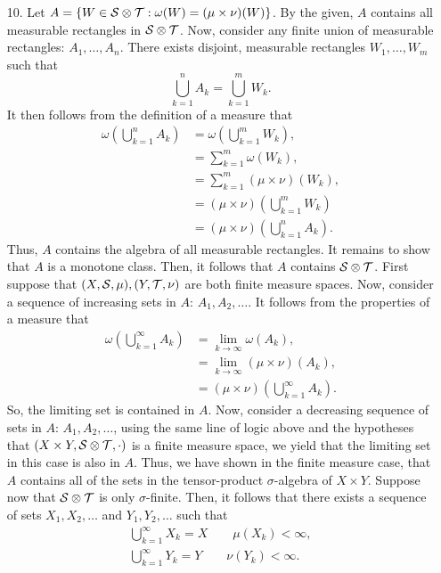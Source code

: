 \documentclass{article}
\theoremstyle{remark}
\begin{document}
\begin{enumerate}[leftmargin=*]
   \item[10.] Let $A = \{W \in \mathcal{S} \otimes \mathcal{T}: \omega(W) = (\mu\times \nu)(W)\}$. By the given, $A$ contains all measurable rectangles in $\mathcal{S} \otimes \mathcal{T}$. Now, consider any finite union of measurable rectangles: $A_1,\ldots,A_n$. There exists disjoint, measurable rectangles $W_1, \ldots, W_m$ such that \[
   \bigcup_{k=1}^n A_k = \bigcup_{k=1}^m W_k.
   \]
   It then follows from the definition of a measure that 
   \begin{align*}
       \omega\left(\bigcup_{k=1}^n A_k\right) &= \omega\left(\bigcup_{k=1}^m W_k\right), \\
       &= \sum_{k=1}^m \omega(W_k), \\
       &= \sum_{k=1}^m (\mu\times\nu)(W_k), \\
       &= (\mu\times\nu)\left(\bigcup_{k=1}^m W_k\right) \\ 
       &= (\mu\times\nu)\left(\bigcup_{k=1}^n A_k\right).
   \end{align*}
   Thus, $A$ contains the algebra of all measurable rectangles. It remains to show that $A$ is a monotone class. Then, it follows that $A$ contains $\mathcal{S} \otimes \mathcal{T}$. First suppose that $(X,\mathcal{S},\mu),(Y,\mathcal{T},\nu)$ are both finite measure spaces. Now, consider a sequence of increasing sets in $A$: $A_1, A_2,\ldots$. It follows from the properties of a measure that 
   \begin{align*}
       \omega\left(\bigcup_{k=1}^\infty A_k\right) &= \lim_{k\to\infty} \omega(A_k), \\
       &= \lim_{k\to\infty} (\mu \times \nu)(A_k), \tag{by def. of $A$} \\
       &= (\mu\times\nu)\left(\bigcup_{k=1}^\infty A_k\right).
   \end{align*}
   So, the limiting set is contained in $A$. Now, consider a decreasing sequence of sets in $A$: $A_1,A_2,\ldots$, using the same line of logic above and the hypotheses that $(X\times Y, \mathcal{S}\otimes\mathcal{T},\cdot)$ is a finite measure space, we yield that the limiting set in this case is also in $A$. Thus, we have shown in the finite measure case, that $A$ contains all of the sets in the tensor-product $\sigma$-algebra of $X\times Y$. Suppose now that $\mathcal{S}\otimes \mathcal{T}$ is only $\sigma$-finite. Then, it follows that there exists a sequence of sets $X_1, X_2, \ldots$ and $Y_1, Y_2, \ldots$ such that 
   \begin{gather*}
       \bigcup_{k=1}^\infty X_k = X \qquad \mu(X_k) < \infty, \\
       \bigcup_{k=1}^\infty Y_k = Y \qquad \nu(Y_k) < \infty.

\end{gather*}
\end{enumerate}
\end{document}
